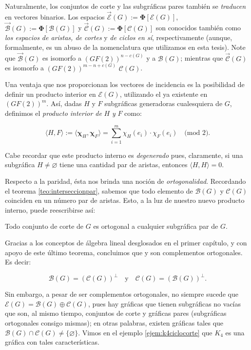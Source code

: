 Naturalmente, los conjuntos de corte y las subgráficas pares también se \textit{traducen} en vectores binarios. Los espacios $\overrightarrow{\mathcal{E}}(G):=\boldsymbol{\Phi}[\mathcal{E}(G)]$, $\overrightarrow{\mathcal{B}}(G):=\boldsymbol{\Phi}[\mathcal{B}(G)]$ y $\overrightarrow{\mathcal{C}}(G):=\boldsymbol{\Phi}[\mathcal{C}(G)]$ son conocidos también como \textit{los espacios de aristas, de cortes} y \textit{de ciclos en sí}, respectivamente (aunque, formalmente, es un abuso de la nomenclatura que utilizamos en esta tesis). Note que $\overrightarrow{\mathcal{B}}(G)$ es isomorfo a $(GF(2))^{n-c(G)}$ y a $\mathcal{B}(G)$; mientras que $\overrightarrow{\mathcal{C}}(G)$ es isomorfo a $(GF(2))^{m-n+c(G)}$ $\mathcal{C}(G)$.

Una ventaja que nos proporcionan los vectores de incidencia es la posibilidad de definir un producto interior en $\mathcal{E}(G)$, utilizando el ya existente en $(GF(2))^{m}$. Así, dadas $H$ y $F$ subgráficas generadoras cualesquiera de $G$, definimos el \textit{producto interior de} $H$ \textit{y} $F$ como:

$$
\langle H,F \rangle  :=  \langle \boldsymbol{\chi}_{H},\boldsymbol{\chi}_{F}\rangle =  \sum_{i=1}^{m} \chi_{H}(e_{i}) \cdot \chi_{F}(e_{i}) \quad \text{(mod }2).
$$

Cabe recordar que este producto interno es \textit{degenerado} pues, claramente, si una subgráfica $H \neq \varnothing$ tiene una cantidad par de aristas, entonces $\langle H,H\rangle = 0$.

Respecto a la paridad, ésta nos brinda una noción de \textit{ortogonalidad}. Recordando el teorema \ref{teo:interseccionpar}, sabemos que todo elemento de $\mathcal{B}(G)$ y $\mathcal{C}(G)$ coinciden en un número par de aristas. Esto, a la luz de nuestro nuevo producto interno, puede reescribirse así:

\begin{teo}
Todo conjunto de corte de $G$ es ortogonal a cualquier subgráfica par de $G$.
\end{teo}


Gracias a los conceptos de álgebra lineal desglosados en el primer capítulo, y con apoyo de este último teorema, concluimos que \bond y \cycle son complementos ortogonales. Es decir:

$$
\mathcal{B}(G)=(\mathcal{C}(G))^{\perp} \quad \text{y} \quad \mathcal{C}(G)=(\mathcal{B}(G))^{\perp}. 
$$

Sin embargo, a pesar de ser complementos ortogonales, no siempre sucede que $\mathcal{E}(G) = \mathcal{B}(G) \oplus \mathcal{C}(G)$, pues hay gráficas que tienen subgráficas no vacías que son, al mismo tiempo, conjuntos de corte y gráficas pares (subgráficas ortogonales consigo mismas); en otras palabras, existen gráficas tales que $\mathcal{B}(G) \cap \mathcal{C}(G) \neq \{ \varnothing\}$. Vimos en el ejemplo \ref{ejem:k4ciclocorte} que $K_{4}$ es una gráfica con tales características.


